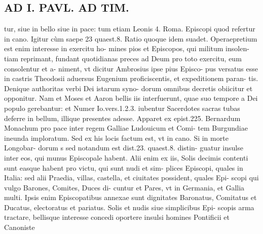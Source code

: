 \documentclass{article}
\begin{document}
\begin{pages}
\section*{AD I. PAVL. AD TIM. }
\marginpar{[ p.139 ]}\pstart tur, siue in bello siue in pace: tum etiam Leonis 4. Roma. Episcopi quod refertur in cano. Igitur cùm saepe 23 quaest.8. Ratio quoque idem suadet. Operaepretium est enim interesse in exercitu ho- mines pios et Episcopos, qui militum insolen- tiam reprimant, fundant quotidianas preces ad Deum pro toto exercitu, eum consolentur et a- niment, vt dicitur Ambrosius ipse pius Episco- pus versatus esse in castris Theodosii aduersus Eugenium proficiscentis, et expeditionem paran- tis. Denique authoritas verbi Dei istarum syno- dorum omnibus decretis obiicitur et opponitur. Nam et Moses et Aaron bellis iis interfuerunt, quae suo tempore a Dei populo gerebantur: et Numer Io.vers.1.2.3. iubentur Sacerdotes sacras tubas deferre in bellum, illique presentes adesse. Apparet ex epist.225. Bernardum Monachum pro pace inter regem Galliae Ludouicum et Comi- tem Burgundiae ineunda imploratum. Sed ex his locis factum est, vt in cano. Si in morte Longobar- dorum s sed notandum est dist.23. quaest.8. distin- guatur insulse inter eos, qui munus Episcopale habent. Alii enim ex iis, Solis decimis contenti sunt easque habent pro victu, qui sunt nudi et sim- plices Episcopi, quales in Italia: sed alii Praedia, villas, castella, et ciuitates possident, quales Epi- scopi qui vulgo Barones, Comites, Duces di- cuntur et Pares, vt in Germania, et Gallia multi. Ipsis enim Episcopatibus annexae sunt dignitates Baronatus, Comitatus et Ducatus, electoratus et pariatus. Solis et nudis siue simplicibus Epi- scopis arma tractare, bellisque interesse concedi oportere insulsi homines Pontificii et Canoniste  \pend

\end{pages}
\end{document}
